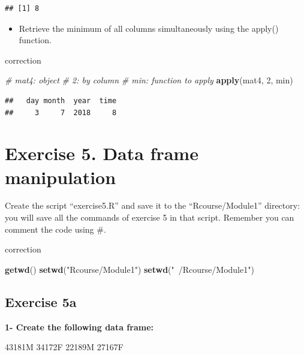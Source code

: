 \documentclass[]{book}
\newenvironment{Shaded}{\begin{snugshade}}{\end{snugshade}}
\newcommand{\CommentTok}[1]{\textcolor[rgb]{0.56,0.35,0.01}{\textit{#1}}}
\newcommand{\DecValTok}[1]{\textcolor[rgb]{0.00,0.00,0.81}{#1}}
\newcommand{\KeywordTok}[1]{\textcolor[rgb]{0.13,0.29,0.53}{\textbf{#1}}}
\newcommand{\NormalTok}[1]{#1}
\newcommand{\StringTok}[1]{\textcolor[rgb]{0.31,0.60,0.02}{#1}}
\providecommand{\tightlist}{%
  \setlength{\itemsep}{0pt}\setlength{\parskip}{0pt}}
\begin{document}
\begin{verbatim}
## [1] 8
\end{verbatim}

\begin{itemize}
\tightlist
\item
  Retrieve the minimum of all columns simultaneously using the apply() function.
\end{itemize}

correction

\begin{Shaded}
\begin{Highlighting}[]
\CommentTok{# mat4: object}
\CommentTok{# 2: by column}
\CommentTok{# min: function to apply}
\KeywordTok{apply}\NormalTok{(mat4, }\DecValTok{2}\NormalTok{, min)}
\end{Highlighting}
\end{Shaded}

\begin{verbatim}
##   day month  year  time 
##     3     7  2018     8
\end{verbatim}

\hypertarget{exercise-5.-data-frame-manipulation}{%
\section{Exercise 5. Data frame manipulation}\label{exercise-5.-data-frame-manipulation}}

Create the script ``exercise5.R'' and save it to the ``Rcourse/Module1'' directory: you will save all the commands of exercise 5 in that script.
Remember you can comment the code using \#.

correction

\begin{Shaded}
\begin{Highlighting}[]
\KeywordTok{getwd}\NormalTok{()}
\KeywordTok{setwd}\NormalTok{(}\StringTok{"Rcourse/Module1"}\NormalTok{)}
\KeywordTok{setwd}\NormalTok{(}\StringTok{"~/Rcourse/Module1"}\NormalTok{)}
\end{Highlighting}
\end{Shaded}

\hypertarget{exercise-5a}{%
\subsection{Exercise 5a}\label{exercise-5a}}

\textbf{1- Create the following data frame:}

\textbar{}43\textbar{}181\textbar{}M\textbar{}
\textbar{}34\textbar{}172\textbar{}F\textbar{}
\textbar{}22\textbar{}189\textbar{}M\textbar{}
\textbar{}27\textbar{}167\textbar{}F\textbar{}
\end{document}
